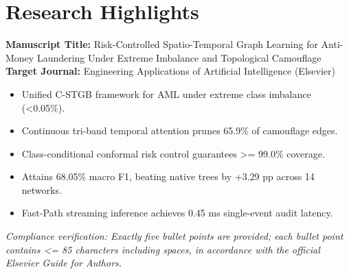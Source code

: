 \documentclass[a4paper,11pt]{article}
\begin{document}
\section*{Research Highlights}
\textbf{Manuscript Title:} Risk-Controlled Spatio-Temporal Graph Learning for Anti-Money Laundering Under Extreme Imbalance and Topological Camouflage\\[1.5ex]
\textbf{Target Journal:} Engineering Applications of Artificial Intelligence (Elsevier)\\[2.0ex]

\begin{itemize}[leftmargin=*,itemsep=6pt]
    \item Unified C-STGB framework for AML under extreme class imbalance (<0.05\%).
    \item Continuous tri-band temporal attention prunes 65.9\% of camouflage edges.
    \item Class-conditional conformal risk control guarantees >= 99.0\% coverage.
    \item Attains 68.05\% macro F1, beating native trees by +3.29 pp across 14 networks.
    \item Fast-Path streaming inference achieves 0.45 ms single-event audit latency.
\end{itemize}

\vspace{2.0ex}
\noindent\footnotesize{\textit{Compliance verification: Exactly five bullet points are provided; each bullet point contains <= 85 characters including spaces, in accordance with the official Elsevier Guide for Authors.}}
\end{document}
